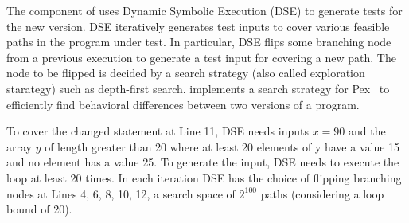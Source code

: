 The  component of  uses Dynamic Symbolic Execution (DSE) to generate tests for the new version. DSE iteratively generates test inputs to cover various feasible paths in the program under test. In particular, DSE flips some branching node from a previous execution to generate a test input for covering a new path. The node to be flipped is decided by a search strategy (also called exploration starategy) such as depth-first search.  implements a search strategy for Pex~\cite{Pex} to efficiently find behavioral differences between two versions of a program.

To cover the changed statement at Line 11, DSE needs inputs
$x=90$ and the array $y$ of length greater than 20 where at least 20 elements of y
have a value 15 and no element has a value 25. To generate the input, DSE needs to execute the loop at least 20 times. In each iteration DSE has the choice of flipping branching nodes at Lines 4, 6, 8, 10, 12, a search space of $2^{100}$ paths (considering a loop bound of 20). 
  
